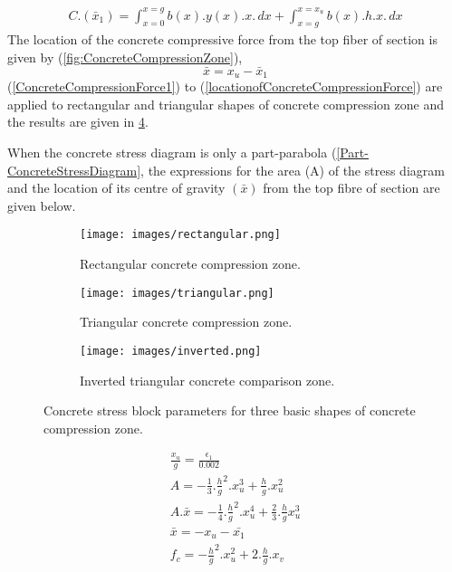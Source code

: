 \begin{align}
C.(\bar x_1)=\int_{x=0}^{x=g}b(x).y(x).x.\,dx+\int_{{x=g}}^{x=x_u}b(x).h.x.\,dx
\label{ConcreteCompressionForce2}
\end{align}
The location of the concrete compressive force from the top fiber of 
section is given by (\fig \ref{fig:ConcreteCompressionZone}),
\begin{equation}
\bar x=x_u-\bar x_1
\label{locationofConcreteCompressionForce}
\end{equation}
\eqn (\ref{ConcreteCompressionForce1}) to \eqn
(\ref{locationofConcreteCompressionForce}) are applied to rectangular
and triangular shapes of concrete compression zone and the results are
given in \fig \ref{fig:ConcreteStressBlockParameter}.

When the concrete stress diagram is only a part-parabola
(\fig \ref{Part-ConcreteStressDiagram}, 
the expressions for the area (A) of the stress diagram and the location
of its centre of gravity ${(\bar x)}$ from the top fibre of section are
given below.
\begin{figure}
\centering
\begin{subfigure}{0.5\textwidth}
\texttt{[image: images/rectangular.png]}
\caption{Rectangular concrete compression zone.}
\label{fig:rectangular}
\end{subfigure}
%
\begin{subfigure}{0.5\textwidth}
\centering
\texttt{[image: images/triangular.png]}
\caption{Triangular concrete compression zone.}
\label{fig:triangular}
\end{subfigure}
%
\begin{subfigure}{0.5\textwidth}
\centering
\texttt{[image: images/inverted.png]}
\caption{Inverted triangular concrete comparison zone.}
\label{fig:inverted}
\end{subfigure}
\caption{Concrete stress block parameters for three basic shapes of concrete compression zone.}
\label{fig:ConcreteStressBlockParameter}
\end{figure}
\begin{align}
\frac{x_u}{g}=\frac{\epsilon_1}{0.002}\\
A=-\frac{1}{3}.\frac{h}{g}^2.x_u^3+\frac{h}{g}.x_u^2\\
A.\bar{x}=-\frac{1}{4}.\frac{h}{g}^2.x_u^4+\frac{2}{3}.\frac{h}{g}x_u^3\\
\bar{x}=-x_u-\bar{x_1}\\
f_c=-\frac{h}{g}^2.x_u^2+2.\frac{h}{g}.x_v
\end{align}

